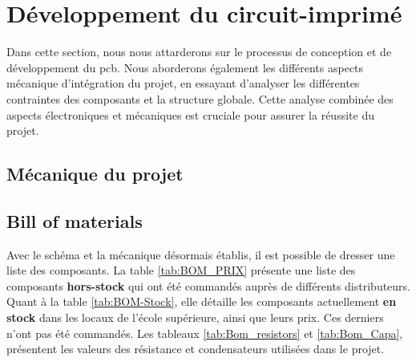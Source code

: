 \section{Développement du circuit-imprimé} \label{sec:Dev-PCB}
Dans cette section, nous nous attarderons sur le processus de conception et de développement du \gls{pcb}. Nous aborderons également les différents aspects mécanique d'intégration du projet, en essayant d'analyser les différentes contraintes des composants et la structure globale. Cette analyse combinée des aspects électroniques et mécaniques est cruciale pour assurer la réussite du projet.

\clearpage

\subsection{Mécanique du projet} \label{ssec:mechProjet}



\clearpage

\subsection{Bill of materials} \label{ssec:BOM}
Avec le schéma et la mécanique désormais établis, il est possible de dresser une liste des composants. La table \ref{tab:BOM_PRIX} présente une liste des composants \textbf{hors-stock} qui ont été commandés auprès de différents distributeurs. Quant à la table \ref{tab:BOM-Stock}, elle détaille les composants actuellement \textbf{en stock} dans les locaux de l'école supérieure, ainsi que leurs prix. Ces derniers n'ont pas été commandés. Les tableaux \ref{tab:Bom_resistors} et \ref{tab:Bom_Capa}, présentent les valeurs des résistance et condensateurs utilisées dans le projet.

